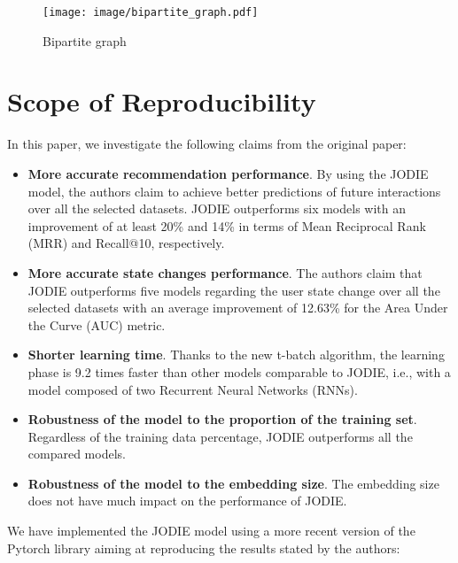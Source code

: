 \begin{figure}[htbp]
    \centering
    \texttt{[image: image/bipartite\_graph.pdf]}
    \caption{Bipartite graph}
    \label{bipartite_graph}
\end{figure}


\section{Scope of Reproducibility}

In this paper, we investigate the following claims from the original paper:
\begin{itemize}
    \item \textbf{More accurate recommendation performance}. By using the JODIE model, the authors claim to achieve better predictions of future interactions over all the selected datasets. JODIE outperforms six models with an improvement of at least 20\% and 14\%  in terms of Mean Reciprocal Rank (MRR) and Recall@10, respectively.
    \item \textbf{More accurate state changes performance}. The authors claim that JODIE outperforms five models regarding the user state change over all the selected datasets with an average improvement of 12.63\% for the Area Under the Curve (AUC) metric.
    \item \textbf{Shorter learning time}. Thanks to the new t-batch algorithm, the learning phase is 9.2 times faster than other models comparable to JODIE, i.e., with a model composed of two Recurrent Neural Networks (RNNs).
    \item \textbf{Robustness of the model to the proportion of the training set}. Regardless of the training data percentage, JODIE outperforms all the compared models.
    \item \textbf{Robustness of the model to the embedding size}. The embedding size does not have much impact on the performance of JODIE.
\end{itemize}
We have implemented the JODIE model using a more recent version of the Pytorch library aiming at reproducing the results stated by the authors:
